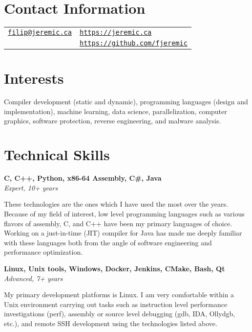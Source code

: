 \documentclass[margin,line]{res}
\begin{document}

\begin{resume}
\section{\sc Contact Information}

\vspace{.05in}

\begin{tabular}{@{}p{3.36in}p{3in}}
\href{mailto:filip@jeremic.ca}{\texttt{filip@jeremic.ca}} & \href{https://jeremic.ca}{\texttt{https://jeremic.ca}} \\
& \href{https://github.com/fjeremic}{\texttt{https://github.com/fjeremic}}
\end{tabular}

\section{\sc Interests}

Compiler development (static and dynamic), programming languages (design and implementation), machine learning, data
science, parallelization, computer graphics, software protection, reverse engineering, and malware analysis.

\section{\sc Technical \newline Skills}

{\bf C, C++, Python, x86-64 Assembly, C\#, Java} \\
{\em Expert, 10+ years}

These technologies are the ones which I have used the most over the years. Because of my field of interest, low level
programming languages such as various flavors of assembly, C, and C++ have been my primary languages of choice. Working 
on a just-in-time (JIT) compiler for Java has made me deeply familiar with these languages both from the angle of 
software engineering and performance optimization.

{\bf Linux, Unix tools, Windows, Docker, Jenkins, CMake, Bash, Qt } \\
{\em Advanced, 7+ years}

My primary development platforms is Linux. I am very comfortable within a Unix environment carrying out tasks such as
instruction level performance investigations (perf), assembly or source level debugging (gdb, IDA, Ollydgb, etc.), and
remote SSH development using the technologies listed above.


\end{resume}
\end{document}
